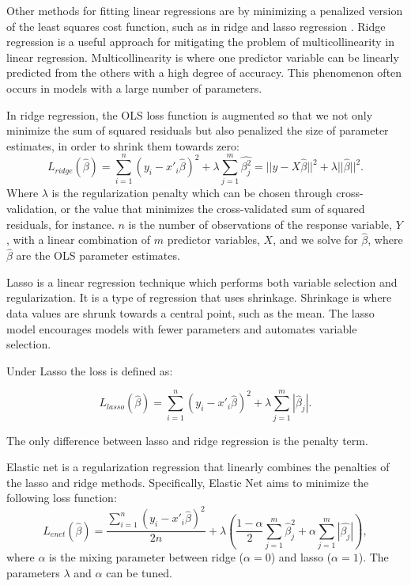 \documentclass[final,3p,times,twocolumn,numbers]{elsarticle}
\begin{document}
Other methods for fitting linear regressions are by minimizing a penalized version of the least squares cost function, such as in ridge and lasso regression \cite{Tibshirani1996a, GeladiPaul1994Mrac}. Ridge regression is a useful approach for mitigating the problem of multicollinearity in linear regression. Multicollinearity is where one predictor variable can be linearly predicted from the others with a high degree of accuracy. This phenomenon often occurs in models with a large number of parameters. 

In ridge regression, the OLS loss function is augmented so that we not only minimize the sum of squared residuals but also penalized the size of parameter estimates, in order to shrink them towards zero:
\begin{equation}
    L_{ridge}(\hat{\beta})=\sum^n_{i=1}(y_i-x'_i\hat{\beta})^2+\lambda\sum^m_{j=1}\hat{\beta^2_j}=||y-X\hat{\beta}||^2+\lambda||\hat{\beta}||^2.
\end{equation}
Where $\lambda$ is the regularization penalty which can be chosen through cross-validation, or the value that minimizes the cross-validated sum of squared residuals, for instance. $n$ is the number of observations of the response variable, $Y$, with a linear combination of $m$ predictor variables, $X$, and we solve for $\hat{\beta}$, where $\hat{\beta}$ are the OLS parameter estimates.



Lasso is a linear regression technique which performs both variable selection and regularization. It is a type of regression that uses shrinkage. Shrinkage is where data values are shrunk towards a central point, such as the mean. The lasso model encourages models with fewer parameters and automates variable selection.

Under Lasso the loss is defined as:

\begin{equation}
    L_{lasso}(\hat{\beta})=\sum^n_{i=1}(y_i-x'_i\hat{\beta})^2+\lambda\sum^m_{j=1}|\hat{\beta}_j|.
\end{equation}

The only difference between lasso and ridge regression is the penalty term.

Elastic net is a regularization regression that linearly combines the penalties of the lasso and ridge methods. Specifically, Elastic Net aims to minimize the following loss function:
\begin{equation}
L_{enet}(\hat{\beta})=\frac{\sum^n_{i=1}(y_i-x'_i\hat{\beta})^2}{2n}+\lambda\left(\frac{1-\alpha}{2}\sum^m_{j=1}\hat{\beta}^2_j+\alpha\sum^m_{j=1}|\hat{\beta_j}|\right),
\end{equation}
where $\alpha$ is the mixing parameter between ridge ($\alpha=0$) and lasso ($\alpha=1$). The parameters $\lambda$ and $\alpha$ can be tuned.
\end{document}
